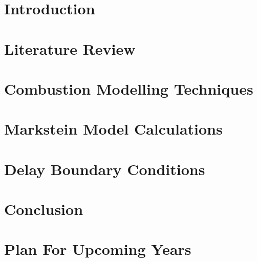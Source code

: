 \documentclass[lmr,second,hyperref,rgb,hyperref,dvipsnames]{uom_thesis_casson}
\title{\xmp@Title}
\author{\xmp@Author}
\begin{document}
\maketitle



\uomtoc

\uomstartmainbody %


\chapter{Introduction} \label{ch:intro}


\chapter{Literature Review} \label{ch:lit-review}


\chapter{Combustion Modelling Techniques} \label{ch:techniques}


\chapter{Markstein Model Calculations} \label{ch:markstein}


\chapter{Delay Boundary Conditions} \label{ch:delay-bcs}


\chapter{Conclusion} \label{ch:conc}


\chapter{Plan For Upcoming Years} \label{ch:plan}



\printbibliography[title={References},heading=bibintoc]
\end{document}
